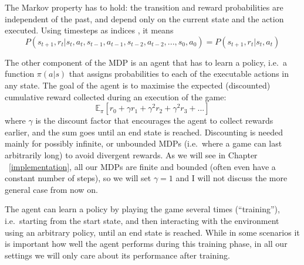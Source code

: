 The Markov property has to hold: the transition and reward probabilities are independent of the past, and depend only on the current state and the action executed. Using timesteps as indices , it means
\begin{equation} \label{eq:MarkovProperty}
P(s_{t+1},r_{t} | s_{t}, a_{t}, s_{t-1}, a_{t-1}, s_{t-2}, a_{t-2}, ..., s_{0}, a_{0}) = P(s_{t+1},r_{t} | s_{t}, a_{t})
\end{equation}

The other component of the MDP is an agent that has to learn a policy, i.e.\ a function $\pi(a|s)$ that assigns probabilities to each of the executable actions in any state. The goal of the agent is to maximise the expected (discounted) cumulative reward collected during an execution of the game:
\begin{equation}\label{eq:cumReward}
\mathbb{E}_{\pi}[r_{0} + \gamma r_{1} + \gamma^2 r_{2} + \gamma^2 r_{3} + ...]
\end{equation}
where $\gamma$ is the discount factor that encourages the agent to collect rewards earlier, and the sum goes until an end state is reached. Discounting is needed mainly for possibly infinite, or unbounded MDPs (i.e.\ where a game can last arbitrarily long) to avoid divergent rewards. As we will see in Chapter ~\ref{implementation}, all our MDPs are finite and bounded (often even have a constant number of steps), so we will set $\gamma=1$ and I will not discuss the more general case from now on. 


The agent can learn a policy by playing the game several times (``training''), i.e.\ starting from the start state, and then interacting with the environment using an arbitrary policy, until an end state is reached. While in some scenarios it is important how well the agent performs during this training phase, in all our settings we will only care about its performance after training.\\

